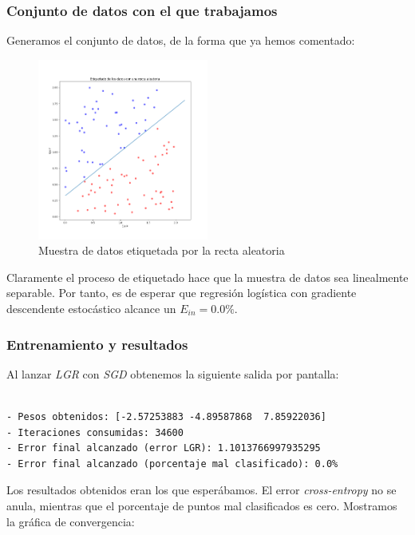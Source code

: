 \documentclass[11pt]{article}
\begin{document}
\subsubsection{Conjunto de datos con el que trabajamos} \label{section:conjunto_datos_lgr}

Generamos el conjunto de datos, de la forma que ya hemos comentado:

\begin{figure}[H]
    \centering
    \includegraphics[width = 0.5\textwidth]{muestra_datos_lgr}
    \caption{Muestra de datos etiquetada por la recta aleatoria}
\end{figure}

Claramente el proceso de etiquetado hace que la muestra de datos sea linealmente separable. Por tanto, es de esperar que regresión logística con gradiente descendente estocástico alcance un $E_{in} = 0.0\%$.

\subsubsection{Entrenamiento y resultados}

Al lanzar \emph{LGR} con \emph{SGD} obtenemos la siguiente salida por pantalla:

\begin{lstlisting}[caption={Resultados del entrenamiento}, captionpos=b]

- Pesos obtenidos: [-2.57253883 -4.89587868  7.85922036]
- Iteraciones consumidas: 34600
- Error final alcanzado (error LGR): 1.1013766997935295
- Error final alcanzado (porcentaje mal clasificado): 0.0%

\end{lstlisting}

Los resultados obtenidos eran los que esperábamos. El error \emph{cross-entropy} no se anula, mientras que el porcentaje de puntos mal clasificados es cero. Mostramos la gráfica de convergencia:
\end{document}
